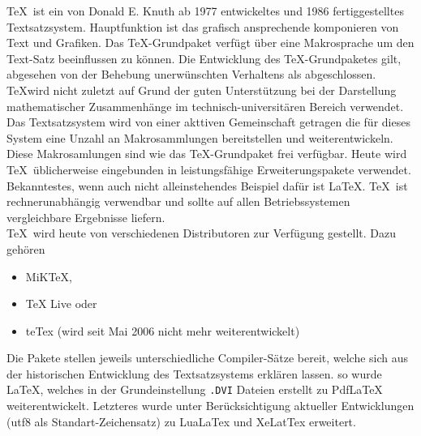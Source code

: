 \renewcommand*{\authorOfNextLines}{Helmut Quinz}
\TeX ~ist ein von Donald E. Knuth ab 1977 entwickeltes und 1986 fertiggestelltes Textsatzsystem.
Hauptfunktion ist das grafisch ansprechende komponieren von Text und Grafiken.
Das \TeX -Grundpaket verfügt über eine Makrosprache um den Text-Satz beeinflussen zu können.
Die Entwicklung des \TeX -Grundpaketes gilt, abgesehen von der Behebung unerwünschten Verhaltens als abgeschlossen.
\TeX wird nicht zuletzt auf Grund der guten Unterstützung bei der Darstellung mathematischer Zusammenhänge im technisch-universitären Bereich verwendet.
Das Textsatzsystem wird von einer akttiven Gemeinschaft getragen die für dieses System eine Unzahl an Makrosammlungen bereitstellen und weiterentwickeln.
Diese Makrosamlungen sind wie das \TeX -Grundpaket frei verfügbar. 
Heute wird \TeX ~üblicherweise eingebunden in leistungsfähige Erweiterungspakete verwendet. 
Bekanntestes, wenn auch nicht alleinstehendes Beispiel dafür ist \LaTeX.
\TeX ~ist rechnerunabhängig verwendbar und sollte auf allen Betriebssystemen vergleichbare Ergebnisse liefern.\\

\TeX ~wird heute von verschiedenen Distributoren zur Verfügung gestellt.
Dazu gehören
\begin{itemize}
	\item MiKTeX,
	\item TeX Live oder
	\item teTex (wird seit Mai 2006 nicht mehr weiterentwickelt) 
\end{itemize}

Die Pakete stellen jeweils unterschiedliche Compiler-Sätze bereit, welche sich aus der historischen Entwicklung des Textsatzsystems erklären lassen.
so wurde LaTeX, welches in der Grundeinstellung \texttt{.DVI} Dateien erstellt zu PdfLaTeX weiterentwickelt.
Letzteres wurde unter Berücksichtigung aktueller Entwicklungen (utf8 als Standart-Zeichensatz) zu LuaLaTex und XeLatTex erweitert.